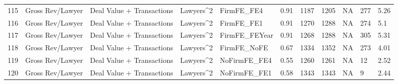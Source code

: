 \documentclass{article}
\begin{document}
\begin{table}[H]
\begin{tabular}{rllllllllll}
  115 & Gross Rev/Lawyer & Deal Value + Transactions & Lawyers^2 & FirmFE\_FE4 & 0.91 & 1187 & 1205 & NA & 277 & 5.26 \\
  116 & Gross Rev/Lawyer & Deal Value + Transactions & Lawyers^2 & FirmFE\_FE1 & 0.91 & 1270 & 1288 & NA & 274 & 5.1 \\
  117 & Gross Rev/Lawyer & Deal Value + Transactions & Lawyers^2 & FirmFE\_FEYear & 0.91 & 1268 & 1288 & NA & 305 & 5.31 \\
  118 & Gross Rev/Lawyer & Deal Value + Transactions & Lawyers^2 & FirmFE\_NoFE & 0.67 & 1334 & 1352 & NA & 273 & 4.01 \\
  119 & Gross Rev/Lawyer & Deal Value + Transactions & Lawyers^2 & NoFirmFE\_FE4 & 0.55 & 1260 & 1261 & NA & 12 & 2.52 \\
  120 & Gross Rev/Lawyer & Deal Value + Transactions & Lawyers^2 & NoFirmFE\_FE1 & 0.58 & 1343 & 1343 & NA & 9 & 2.44 \\
   \hline
\end{tabular}
\end{table}
\end{document}
